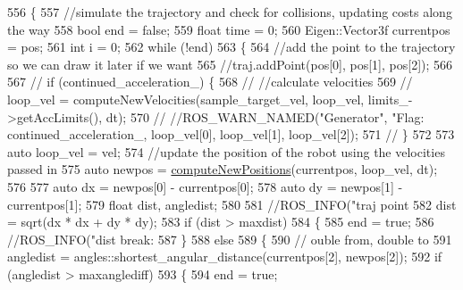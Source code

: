 \begin{DoxyCode}
556         \{
557             \textcolor{comment}{//simulate the trajectory and check for collisions, updating costs along the way}
558             \textcolor{keywordtype}{bool} end = \textcolor{keyword}{false};
559             \textcolor{keywordtype}{float} time = 0;
560             Eigen::Vector3f currentpos = pos;
561             \textcolor{keywordtype}{int} i = 0;
562             \textcolor{keywordflow}{while} (!end)
563             \{
564                 \textcolor{comment}{//add the point to the trajectory so we can draw it later if we want}
565                 \textcolor{comment}{//traj.addPoint(pos[0], pos[1], pos[2]);}
566 
567                 \textcolor{comment}{// if (continued\_acceleration\_) \{}
568                 \textcolor{comment}{//   //calculate velocities}
569                 \textcolor{comment}{//   loop\_vel = computeNewVelocities(sample\_target\_vel, loop\_vel, limits\_->getAccLimits(),
       dt);}
570                 \textcolor{comment}{//   //ROS\_WARN\_NAMED("Generator", "Flag: %
       continued\_acceleration\_, loop\_vel[0], loop\_vel[1], loop\_vel[2]);}
571                 \textcolor{comment}{// \}}
572 
573                 \textcolor{keyword}{auto} loop\_vel = vel;
574                 \textcolor{comment}{//update the position of the robot using the velocities passed in}
575                 \textcolor{keyword}{auto} newpos = \hyperlink{classcl__move__base__z_1_1backward__local__planner_1_1BackwardLocalPlanner_a0fe2ebd23fd79e8b574127e819ef0e14}{computeNewPositions}(currentpos, loop\_vel, dt);
576 
577                 \textcolor{keyword}{auto} dx = newpos[0] - currentpos[0];
578                 \textcolor{keyword}{auto} dy = newpos[1] - currentpos[1];
579                 \textcolor{keywordtype}{float} dist, angledist;
580 
581                 \textcolor{comment}{//ROS\_INFO("traj point %
582                 dist = sqrt(dx * dx + dy * dy);
583                 \textcolor{keywordflow}{if} (dist > maxdist)
584                 \{
585                     end = \textcolor{keyword}{true};
586                     \textcolor{comment}{//ROS\_INFO("dist break: %
587                 \}
588                 \textcolor{keywordflow}{else}
589                 \{
590                     \textcolor{comment}{// ouble from, double to}
591                     angledist = angles::shortest\_angular\_distance(currentpos[2], newpos[2]);
592                     \textcolor{keywordflow}{if} (angledist > maxanglediff)
593                     \{
594                         end = \textcolor{keyword}{true};
}}
\end{DoxyCode}
